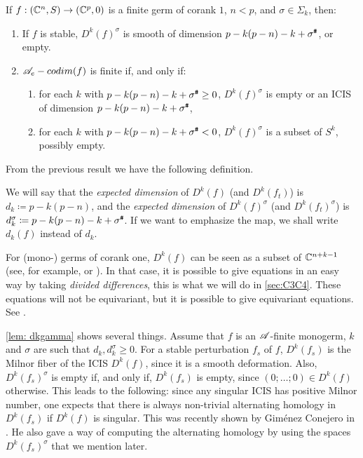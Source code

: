 \documentclass[a4paper,12pt]{amsart}
\begin{document}
\begin{lemma}\label{lem: dkgamma}
If $f:(\mathbb{C}^n,S)\rightarrow (\mathbb{C}^p,0)$ is a finite germ of corank $1$, $n < p$, and $\sigma\in\Sigma_k$, then:
\begin{enumerate}
	\item If $f$ is stable, $D^k(f)^\sigma$ is smooth of dimension $p-k(p-n)-k+\sigma^{\texttt{\#}}$, or empty.\label{iPD}
	\item $\mathscr{A}_e-codim(f)$ is finite if, and only if:\label{iiPD}
	\begin{enumerate}
		\item for each $k$ with $p-k(p-n)-k+\sigma^{\texttt{\#}}\geq0$, $D^k(f)^\sigma$ is empty or an ICIS of dimension $p-k(p-n)-k+\sigma^{\texttt{\#}}$,
		\item for each $k$ with $p-k(p-n)-k+\sigma^{\texttt{\#}}<0$, $D^k(f)^\sigma$ is a subset of $S^k$, possibly empty.
	\end{enumerate}
\end{enumerate}
\label{DP}
\end{lemma}

From the previous result we have the following definition.

\begin{definition}\label{def:expecteddimension}
We will say that the \textit{expected dimension} of $D^k(f)$ (and $D^k(f_t)$) is $d_k\coloneqq p-k(p-n)$, and the \textit{expected dimension} of $D^k(f)^\sigma$ (and $D^k(f_t)^\sigma$) is $d_k^\sigma\coloneqq p-k(p-n)-k+\sigma^{\texttt{\#}}$. If we want to emphasize the map, we shall write $d_k(f)$ instead of $d_k$.
\end{definition}


\begin{remark}\label{rem: eqs Dk}
For (mono-) germs of corank one, $D^k(f)$ can be seen as a subset of $\mathbb{C}^{n+k-1}$ (see, for example, \cite[end of p. 371]{Mond1987} or \cite[p. 52]{GimenezConejero2022}). In that case, it is possible to give equations in an easy way by taking \textsl{divided differences}, this is what we will do in \cref{sec:C3C4}.
These equations will not be equivariant, but it is possible to give equivariant equations. See \cite[Section 9.5]{Mond2020}.
\end{remark}

\begin{remark}\label{rem:propertiesDk}
\cref{lem: dkgamma} shows several things. Assume that $f$ is an $\mathscr{A}$-finite monogerm, $k$ and $\sigma$ are such that $d_k,d_k^\sigma\geq0$. For a stable perturbation $f_s$ of $f$, $D^k(f_s)$ is the Milnor fiber of the ICIS $D^k(f)$, since it is a smooth deformation. Also, $D^k(f_s)^\sigma$ is empty if, and only if, $D^k(f_s)$ is empty, since $(0;\dots; 0)\in D^k(f)$ otherwise. 
This leads to the following: since any singular ICIS has positive Milnor number, one expects that there is always non-trivial alternating homology in $D^k(f_s)$ if $D^k(f)$ is singular. This was recently shown by Giménez Conejero in \cite[Theorem 4.8]{GimenezConejero2022c}. He also gave a way of computing the alternating homology by using the spaces $D^k(f_s)^\sigma$ that we mention later.
\end{remark}
\end{document}
